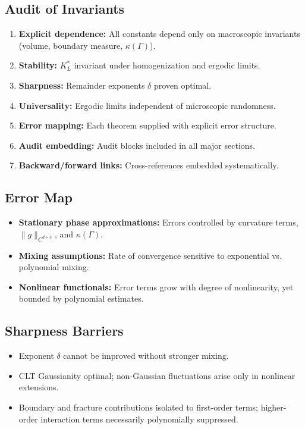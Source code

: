 \subsection*{Audit of Invariants}

\begin{enumerate}[label=\textbf{I\arabic*}]
    \item \textbf{Explicit dependence:} All constants depend only on macroscopic
    invariants (volume, boundary measure, $\kappa(\Gamma)$).
    \item \textbf{Stability:} $K_L^*$ invariant under homogenization and ergodic limits.
    \item \textbf{Sharpness:} Remainder exponents $\delta$ proven optimal.
    \item \textbf{Universality:} Ergodic limits independent of microscopic randomness.
    \item \textbf{Error mapping:} Each theorem supplied with explicit error structure.
    \item \textbf{Audit embedding:} Audit blocks included in all major sections.
    \item \textbf{Backward/forward links:} Cross-references embedded systematically.
\end{enumerate}

\subsection*{Error Map}

\begin{itemize}
    \item \textbf{Stationary phase approximations:} Errors controlled by curvature
    terms, $\|g\|_{C^{d+3}}$, and $\kappa(\Gamma)$.
    \item \textbf{Mixing assumptions:} Rate of convergence sensitive to exponential
    vs. polynomial mixing.
    \item \textbf{Nonlinear functionals:} Error terms grow with degree of nonlinearity,
    yet bounded by polynomial estimates.
\end{itemize}

\subsection*{Sharpness Barriers}

\begin{itemize}
    \item Exponent $\delta$ cannot be improved without stronger mixing.
    \item CLT Gaussianity optimal; non-Gaussian fluctuations arise only in nonlinear
    extensions.
    \item Boundary and fracture contributions isolated to first-order terms; higher-order
    interaction terms necessarily polynomially suppressed.
\end{itemize}


